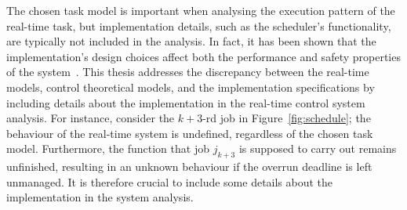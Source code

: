 The chosen task model is important when analysing the execution pattern of the real-time task, but implementation details, such as the scheduler's functionality, are typically not included in the analysis.
In fact, it has been shown that the implementation's design choices affect both the performance and safety properties of the system~\cite{Cervin:2005}.
This thesis addresses the discrepancy between the real-time models, control theoretical models, and the implementation specifications by including details about the implementation in the real-time control system analysis.
For instance, consider the $k+3$-rd job in Figure~\ref{fig:schedule}; the behaviour of the real-time system is undefined, regardless of the chosen task model.
Furthermore, the function that job $j_{k+3}$ is supposed to carry out remains unfinished, resulting in an unknown behaviour if the overrun deadline is left unmanaged.
It is therefore crucial to include some details about the implementation in the system analysis.

